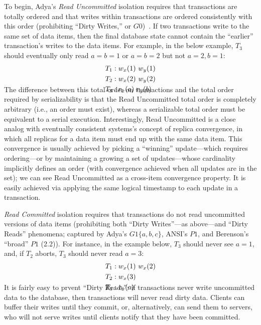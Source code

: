 To begin, Adya's \textit{Read Uncommitted} isolation requires that
transactions are totally ordered and that writes within transactions
are ordered consistently with this order (prohibiting ``Dirty
Writes,'' or $G0$)~\cite{adya}. If two transactions write to the same
set of data items, then the final database state cannot contain the
``earlier'' transaction's writes to the data items. For example, in
the below example, $T_3$ should eventually only read $a=b=1$ or
$a=b=2$ but not $a=2, b=1$:
\begin{align*}
\small
T_1 &: w_x(1)~w_y(1)
\\T_2 &: w_x(2)~w_y(2)
\\T_3 &: r_x(a)~r_y(b)\\[-2em]
\end{align*}
The difference between this total order on transactions and the total
order required by serializability is that the Read Uncommitted total
order is completely arbitrary (i.e., an order must exist), whereas a
serializable total order must be equivalent to a serial
execution. Interestingly, Read Uncommitted is a close analog with
eventually consistent systems's concept of replica convergence, in
which all replicas for a data item must end up with the same data
item. This convergence is usually achieved by picking a ``winning''
update---which requires ordering---or by maintaining a growing a set
of updates---whose cardinality implicitly defines an order (with
convergence achieved when all updates are in the set); we can see Read
Uncommitted as a cross-item convergence property. It is easily
achieved via applying the same logical timestamp to each update in a
transaction.

\textit{Read Committed} isolation requires that transactions do not
read uncommitted versions of data items (prohibiting both ``Dirty
Writes''---as above---and ``Dirty Reads'' phenomena; captured by
Adya's $G1\{a,b,c\}$, ANSI's $P1$, and Berenson's ``broad'' $P1$
(2.2)). For instance, in the example below, $T_3$ should never see
$a=1$, and, if $T_2$ aborts, $T_3$ should never read $a=3$:
\vspace{-.5em}
\begin{align*}
\small
T_1 &: w_x(1)~w_x(2)
\\T_2 &: w_x(3)\\
T_3 &: r_x(a)\\[-2em]
\end{align*}
It is fairly easy to prvent ``Dirty Reads'': if transactions never
write uncommitted data to the database, then transactions will never
read dirty data. Clients can buffer their writes until they commit,
or, alternatively, can send them to servers, who will not serve writes
until clients notify that they have been committed.


